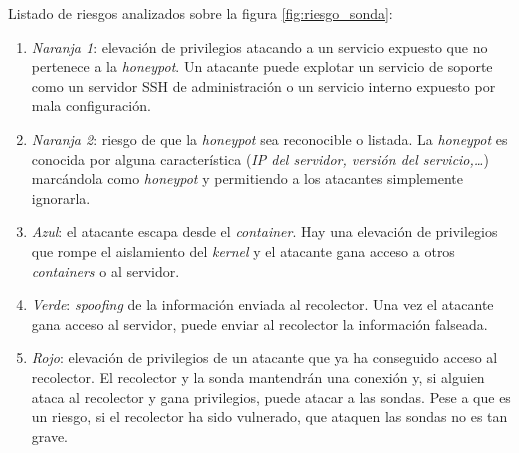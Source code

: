 Listado de riesgos analizados sobre la figura \ref{fig:riesgo_sonda}:
\begin{enumerate}
    \item \emph{Naranja 1}: elevación de privilegios atacando a un servicio expuesto que no pertenece a la \emph{honeypot}. Un atacante puede explotar un servicio de soporte como un servidor SSH de administración o un servicio interno expuesto por mala configuración.
    \item \emph{Naranja 2}: riesgo de que la \emph{honeypot} sea reconocible o listada. La \emph{honeypot} es conocida por alguna característica (\emph{IP del servidor, versión del servicio,\ldots}) marcándola como \emph{honeypot} y permitiendo a los atacantes simplemente ignorarla.
    \item \emph{Azul}: el atacante escapa desde el \emph{container}. Hay una elevación de privilegios que rompe el aislamiento del \emph{kernel} y el atacante gana acceso a otros \emph{containers} o al servidor.
    \item \emph{Verde}: \emph{spoofing} de la información enviada al recolector. Una vez el atacante gana acceso al servidor, puede enviar al recolector la información falseada.
    \item \emph{Rojo}: elevación de privilegios de un atacante que ya ha conseguido acceso al recolector. El recolector y la sonda mantendrán una conexión y, si alguien ataca al recolector y gana privilegios, puede atacar a las sondas. Pese a que es un riesgo, si el recolector ha sido vulnerado, que ataquen las sondas no es tan grave.
\end{enumerate}


